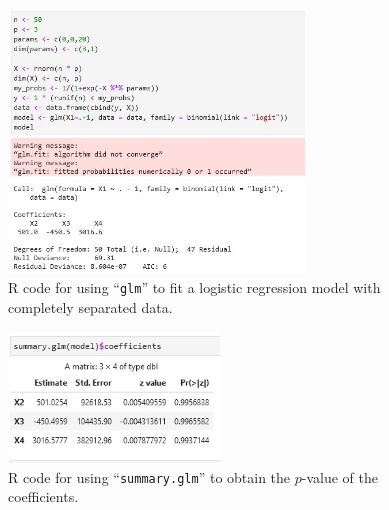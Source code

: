 \documentclass[11pt]{article}
\theoremstyle{plain}
\theoremstyle{definition}
\theoremstyle{remark}
\begin{document}
\begin{figure}
        \begin{center}
            \includegraphics[width=0.7\textwidth]{1} 
        \end{center}
        \caption{R code for using ``\texttt{glm}'' to fit a logistic regression model with completely separated data.}   
    \label{figure1}
\end{figure}

\begin{figure}
        \begin{center}
            \includegraphics[width=0.5\textwidth]{2} 
        \end{center}
        \caption{R code for using ``\texttt{summary.glm}'' to obtain the $p$-value of the coefficients.}   
    \label{figure2}
\end{figure}


\end{document}
